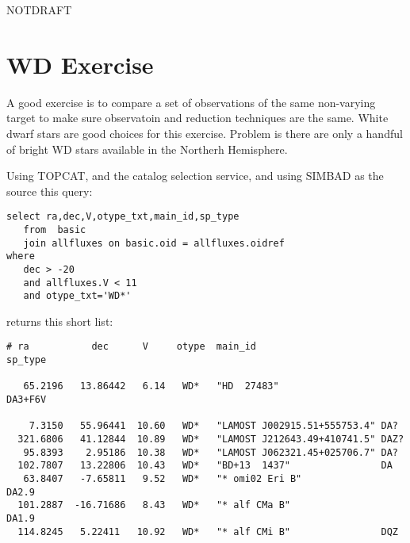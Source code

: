 \documentclass[letter,11pt,oneside]{article}
\def\documentisdraft{NOTDRAFT}
\begin{document}

\setcounter{section}{0}

\ifx\documentisdraft\drafttest
\linenumbers    %
\fi


\section*{WD Exercise}

A good exercise is to compare a set of observations of the 
same non-varying target to make sure observatoin and reduction
techniques are the same. White dwarf stars are good choices
for this exercise. Problem is there are only a handful
of bright WD stars available in the Northerh Hemisphere.

Using TOPCAT, and the catalog selection service,
and using SIMBAD as the source this query:

\begingroup \fontsize{10pt}{10pt}
\selectfont
\begin{verbatim} 
select ra,dec,V,otype_txt,main_id,sp_type 
   from  basic
   join allfluxes on basic.oid = allfluxes.oidref
where 
   dec > -20 
   and allfluxes.V < 11 
   and otype_txt='WD*'
\end{verbatim}
\endgroup

returns this short list:

\begingroup \fontsize{10pt}{10pt}
\selectfont
\begin{verbatim} 
# ra           dec      V     otype  main_id                      sp_type

   65.2196   13.86442   6.14   WD*   "HD  27483"                  DA3+F6V

    7.3150   55.96441  10.60   WD*   "LAMOST J002915.51+555753.4" DA?    
  321.6806   41.12844  10.89   WD*   "LAMOST J212643.49+410741.5" DAZ?   
   95.8393    2.95186  10.38   WD*   "LAMOST J062321.45+025706.7" DA?    
  102.7807   13.22806  10.43   WD*   "BD+13  1437"                DA     
   63.8407   -7.65811   9.52   WD*   "* omi02 Eri B"              DA2.9  
  101.2887  -16.71686   8.43   WD*   "* alf CMa B"                DA1.9  
  114.8245   5.22411   10.92   WD*   "* alf CMi B"                DQZ    
\end{verbatim}
\endgroup
\end{document}
